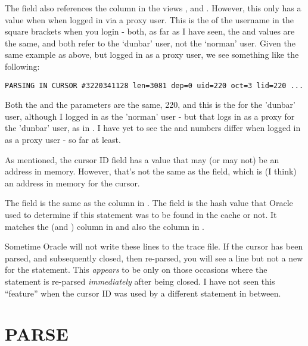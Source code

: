 The  field also references the column  in the views ,  and . However, this only has a value when when logged in via a proxy user. This is the  of the username in the square brackets when you login -  both, as far as I have seen, the  and  values are the same, and both refer to the `dunbar' user, not the `norman' user. Given the same example as above, but logged in as a proxy user, we see something like the following:

\begin{lstlisting}[numbers=none,caption={Parsing In Cursor Line - Proxy User}]
PARSING IN CURSOR #3220341128 len=3081 dep=0 uid=220 oct=3 lid=220 ...
\end{lstlisting}

Both the  and the  parameters are the same, 220, and this is the  for the 'dunbar' user, although I logged in as the 'norman' user - but that logs in as a proxy for the 'dunbar' user, as in . I have yet to see the  and  numbers differ when logged in as a proxy user - so far at least.


As mentioned, the cursor ID field has a value that may (or may not) be an address in memory. However, that's not the same as the  field, which is (I think) an address in memory for the cursor.

The  field is the same as the  column in . The  field is the hash value that Oracle used to determine if this statement was to be found in the cache or not. It matches the  (and ) column in  and also the  column in .

Sometime Oracle will not write these lines to the trace file. If the cursor has been parsed, and subsequently closed, then re-parsed, you will see a  line but not a new  for the statement. This \emph{appears} to be only on those occasions where the statement is re-parsed \emph{immediately} after being closed. I have not seen this ``feature'' when the cursor ID was used by a different statement in between.

\newpage\section{PARSE}\label{parse}

